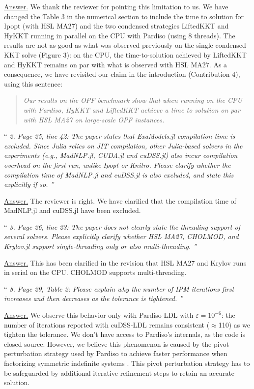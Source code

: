\documentclass[10pt,a4paper]{article}
\newenvironment{quotereviewer}{\vspace{.5cm}{\underline\reviewername} ``\it\footnotesize}{''}
\newcommand{\answer}{\vspace{1mm}\underline{Answer.} }
\begin{document}
\answer
We thank the reviewer for pointing this limitation to us.
We have changed the Table 3 in the numerical section to include the time
to solution for Ipopt (with HSL MA27) and the two condensed strategies
LiftedKKT and HyKKT running in parallel on the CPU with Pardiso (using 8 threads).
The results are not as good as what was observed previously on the single condensed KKT solve (Figure 3):
on the CPU, the time-to-solution achieved by LiftedKKT and HyKKT remains on par with what is observed with HSL MA27.
As a consequence, we have revisited our claim in the introduction (Contribution 4), using this sentence:
\begin{quote}
  \textit{Our results on the OPF benchmark show that when running on the CPU with Pardiso,
  HyKKT and LiftedKKT achieve a time to solution on par with HSL MA27 on large-scale OPF instances.}
\end{quote}

\begin{quotereviewer}
2. Page 25, line 42: The paper states that ExaModels.jl compilation time is excluded. Since Julia
relies on JIT compilation, other Julia-based solvers in the experiments (e.g., MadNLP.jl, CUDA.jl
and cuDSS.jl) also incur compilation overhead on the first run, unlike Ipopt or Knitro. Please clarify
whether the compilation time of MadNLP.jl and cuDSS.jl is also excluded, and state this explicitly if so.
\end{quotereviewer}

\answer
The reviewer is right. We have clarified that the compilation time of
MadNLP.jl and cuDSS.jl have been excluded.

\begin{quotereviewer}
3. Page 26, line 23: The paper does not clearly state the threading support of several solvers. Please
explicitly clarify whether HSL MA27, CHOLMOD, and Krylov.jl support single-threading only or also
multi-threading.
\end{quotereviewer}

\answer
This has been clarified in the revision that HSL MA27 and Krylov runs in serial
on the CPU. CHOLMOD supports multi-threading.

\begin{quotereviewer}
8. Page 29, Table 2: Please explain why the number of IPM iterations first increases and then decreases
as the tolerance is tightened.
\end{quotereviewer}

\answer
We observe this behavior only with Pardiso-LDL with $\varepsilon = 10^{-6}$: the number of iterations
reported with cuDSS-LDL remains consistent ($\approx$110) as we tighten the tolerance.
We don't have access to Pardiso's internals, as the code is closed source. However,
we believe this phenomenon is caused by the pivot perturbation strategy used by Pardiso
to achieve faster performance when factorizing symmetric indefinite systems \cite{schenk2006fast}. This
pivot perturbation strategy has to be safeguarded by additional iterative refinement
steps to retain an accurate solution.
\end{document}
